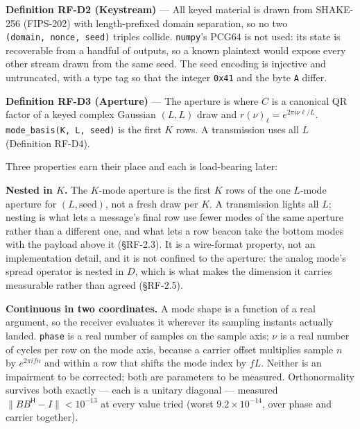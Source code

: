 \documentclass[10pt,letterpaper,twocolumn]{article}
\begin{document}
\textbf{Definition RF-D2 (Keystream)} --- All keyed material is drawn from SHAKE-256 (FIPS-202) with length-prefixed domain separation, so no two \texttt{(\allowbreak{}domain,\allowbreak{}\ nonce,\allowbreak{}\ seed)\allowbreak{}} triples collide. \texttt{numpy}'s PCG64 is not used: its state is recoverable from a handful of outputs, so a known plaintext would expose every other stream drawn from the same seed. The seed encoding is injective and untruncated, with a type tag so that the integer \texttt{0x41} and the byte \texttt{A} differ.

\textbf{Definition RF-D3 (Aperture)} --- The aperture is
where \(C\) is a canonical QR factor of a keyed complex Gaussian \((L,L)\) draw and \(r(\nu)_\ell = e^{2\pi i \nu \ell/L}\). \texttt{mode\_\allowbreak{}basis(\allowbreak{}K,\allowbreak{}\ L,\allowbreak{}\ seed)\allowbreak{}} is the first \(K\) rows. A transmission uses all \(L\) (Definition RF-D4).

Three properties earn their place and each is load-bearing later:

\textbf{Nested in \(K\).} The \(K\)-mode aperture is the first \(K\) rows of the one \(L\)-mode aperture for \((L, \text{seed})\), not a fresh draw per \(K\). A transmission lights all \(L\); nesting is what lets a message's final row use fewer modes of the same aperture rather than a different one, and what lets a row beacon take the bottom modes with the payload above it (§RF-2.3). It is a wire-format property, not an implementation detail, and it is not confined to the aperture: the analog mode's spread operator is nested in \(D\), which is what makes the dimension it carries measurable rather than agreed (§RF-2.5).

\textbf{Continuous in two coordinates.} A mode shape is a function of a real argument, so the receiver evaluates it wherever its sampling instants actually landed. \texttt{phase} is a real number of samples on the sample axis; \(\nu\) is a real number of cycles per row on the mode axis, because a carrier offset multiplies sample \(n\) by \(e^{2\pi i f n}\) and within a row that shifts the mode index by \(fL\). Neither is an impairment to be corrected; both are parameters to be measured. Orthonormality survives both exactly --- each is a unitary diagonal --- measured \(\lVert BB^{\mathsf H} - I\rVert < 10^{-13}\) at every value tried (worst \(9.2\times10^{-14}\), over phase and carrier together).
\end{document}

